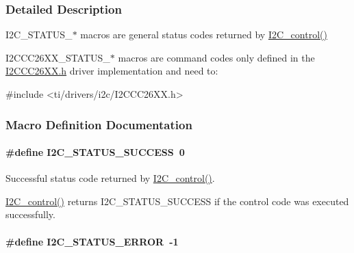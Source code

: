 \subsubsection{Detailed Description}
I2\+C\+\_\+\+S\+T\+A\+T\+U\+S\+\_\+$\ast$ macros are general status codes returned by \hyperlink{_i2_c_8h_a633003582213a5098467a4e647cc52f9}{I2\+C\+\_\+control()}

I2\+C\+C\+C26\+X\+X\+\_\+\+S\+T\+A\+T\+U\+S\+\_\+$\ast$ macros are command codes only defined in the \hyperlink{_i2_c_c_c26_x_x_8h}{I2\+C\+C\+C26\+X\+X.\+h} driver implementation and need to\+: 
\begin{DoxyCode}
\textcolor{preprocessor}{#include <ti/drivers/i2c/I2CCC26XX.h>}
\end{DoxyCode}
 

\subsubsection{Macro Definition Documentation}
\paragraph[{I2\+C\+\_\+\+S\+T\+A\+T\+U\+S\+\_\+\+S\+U\+C\+C\+E\+S\+S}]{\setlength{\rightskip}{0pt plus 5cm}\#define I2\+C\+\_\+\+S\+T\+A\+T\+U\+S\+\_\+\+S\+U\+C\+C\+E\+S\+S~0}\label{group___i2_c___s_t_a_t_u_s_gaa0bcf3acd26ac82bd8ff91daba2c78c4}


Successful status code returned by \hyperlink{_i2_c_8h_a633003582213a5098467a4e647cc52f9}{I2\+C\+\_\+control()}. 

\hyperlink{_i2_c_8h_a633003582213a5098467a4e647cc52f9}{I2\+C\+\_\+control()} returns I2\+C\+\_\+\+S\+T\+A\+T\+U\+S\+\_\+\+S\+U\+C\+C\+E\+S\+S if the control code was executed successfully. 
\paragraph[{I2\+C\+\_\+\+S\+T\+A\+T\+U\+S\+\_\+\+E\+R\+R\+O\+R}]{\setlength{\rightskip}{0pt plus 5cm}\#define I2\+C\+\_\+\+S\+T\+A\+T\+U\+S\+\_\+\+E\+R\+R\+O\+R~-\/1}\label{group___i2_c___s_t_a_t_u_s_ga7323fe57c39c46d0da9910e17f5f0b06}


